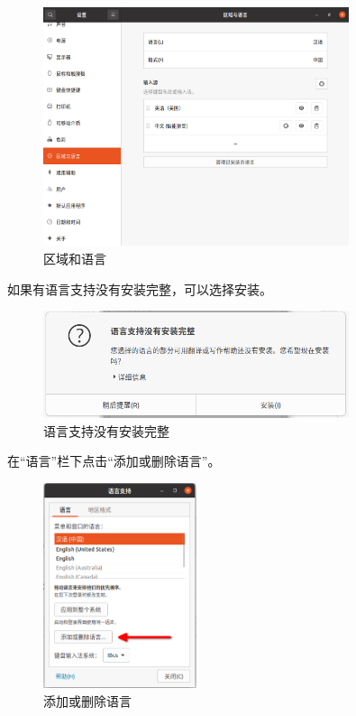 \documentclass[UTF-8]{ctexart}
\begin{document}
				\begin{figure}[H]
					\centering
					\includegraphics[width=0.8\textwidth]{fig/settings_locs_and_langs.png}
					\caption*{区域和语言}
				\end{figure}
			
				如果有语言支持没有安装完整，可以选择安装。
				
				\begin{figure}[H]
					\centering
					\includegraphics[width=0.8\textwidth]{fig/langs_support.png}
					\caption*{语言支持没有安装完整}
				\end{figure}
				
				在“语言”栏下点击“添加或删除语言”。
				
				\begin{figure}[H]
					\centering
					\includegraphics[width=0.4\textwidth]{fig/add_or_del_langs.png}
					\caption*{添加或删除语言}
				\end{figure}
				
\end{document}
